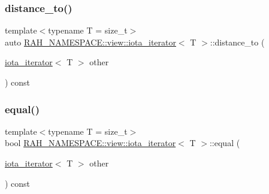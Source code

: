 \mbox{\label{struct_r_a_h___n_a_m_e_s_p_a_c_e_1_1view_1_1iota__iterator_aa31762f7d7101b2a7a8586099da1684d}} 
\subsubsection{\texorpdfstring{distance\_to()}{distance\_to()}}
{\footnotesize\ttfamily template$<$typename T  = size\+\_\+t$>$ \\
auto \mbox{\hyperlink{struct_r_a_h___n_a_m_e_s_p_a_c_e_1_1view_1_1iota__iterator}{R\+A\+H\+\_\+\+N\+A\+M\+E\+S\+P\+A\+C\+E\+::view\+::iota\+\_\+iterator}}$<$ T $>$\+::distance\+\_\+to (\begin{DoxyParamCaption}\item[{\mbox{\hyperlink{struct_r_a_h___n_a_m_e_s_p_a_c_e_1_1view_1_1iota__iterator}{iota\+\_\+iterator}}$<$ T $>$}]{other }\end{DoxyParamCaption}) const\hspace{0.3cm}{\ttfamily [inline]}}

\mbox{\label{struct_r_a_h___n_a_m_e_s_p_a_c_e_1_1view_1_1iota__iterator_a8f88b6d69de47de4bbff275a7c11a8f7}} 
\subsubsection{\texorpdfstring{equal()}{equal()}}
{\footnotesize\ttfamily template$<$typename T  = size\+\_\+t$>$ \\
bool \mbox{\hyperlink{struct_r_a_h___n_a_m_e_s_p_a_c_e_1_1view_1_1iota__iterator}{R\+A\+H\+\_\+\+N\+A\+M\+E\+S\+P\+A\+C\+E\+::view\+::iota\+\_\+iterator}}$<$ T $>$\+::equal (\begin{DoxyParamCaption}\item[{\mbox{\hyperlink{struct_r_a_h___n_a_m_e_s_p_a_c_e_1_1view_1_1iota__iterator}{iota\+\_\+iterator}}$<$ T $>$}]{other }\end{DoxyParamCaption}) const\hspace{0.3cm}{\ttfamily [inline]}}

